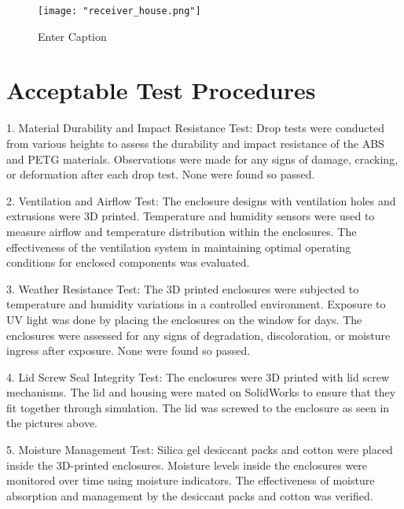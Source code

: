 \documentclass[class=report,11pt,crop=false]{standalone}
\begin{document}
 
\begin{figure}[H]
    \centering
    \texttt{[image: "receiver\_house.png"]}
    \caption{Enter Caption}
    \label{fig:enter-label5}
\end{figure}




 

\section{Acceptable Test Procedures}
 
1. Material Durability and Impact Resistance Test:
 Drop tests were conducted from various heights to assess the durability and impact resistance of the ABS and PETG materials. Observations were made for any signs of damage, cracking, or deformation after each drop test. None were found so passed. 
 \newline
 

2. Ventilation and Airflow Test:
    The enclosure designs with ventilation holes and extrusions were 3D printed. Temperature and humidity sensors were used to measure airflow and temperature distribution within the enclosures.
    The effectiveness of the ventilation system in maintaining optimal operating conditions for enclosed components was evaluated.
    \newline

3. Weather Resistance Test:
    The 3D printed enclosures were subjected to temperature and humidity variations in a controlled environment. Exposure to UV light was done by placing the enclosures on the window for days. The enclosures were assessed for any signs of degradation, discoloration, or moisture ingress after exposure. None were found so passed.
    \newline

4. Lid Screw Seal Integrity Test:
    The enclosures were 3D printed with lid screw mechanisms. The lid and housing were mated on SolidWorks to ensure that they fit together through simulation. The lid was screwed to the enclosure as seen in the pictures above.
    \newline
    

5. Moisture Management Test:
 Silica gel desiccant packs and cotton were placed inside the 3D-printed enclosures. Moisture levels inside the enclosures were monitored over time using moisture indicators. The effectiveness of moisture absorption and management by the desiccant packs and cotton was verified.
\newline
\end{document}
